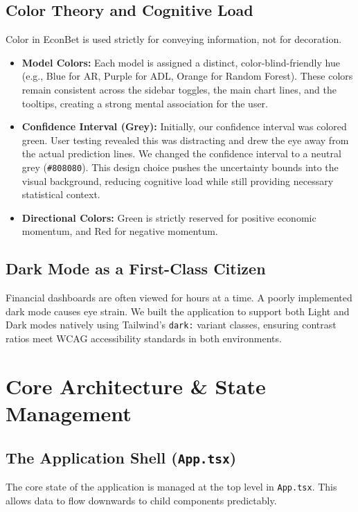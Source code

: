 \documentclass[12pt]{article}
\begin{document}
\subsection{Color Theory and Cognitive Load}
Color in EconBet is used strictly for conveying information, not for decoration. 
\begin{itemize}
    \item \textbf{Model Colors:} Each model is assigned a distinct, color-blind-friendly hue (e.g., Blue for AR, Purple for ADL, Orange for Random Forest). These colors remain consistent across the sidebar toggles, the main chart lines, and the tooltips, creating a strong mental association for the user.
    \item \textbf{Confidence Interval (Grey):} Initially, our confidence interval was colored green. User testing revealed this was distracting and drew the eye away from the actual prediction lines. We changed the confidence interval to a neutral grey (\texttt{\#808080}). This design choice pushes the uncertainty bounds into the visual background, reducing cognitive load while still providing necessary statistical context.
    \item \textbf{Directional Colors:} Green is strictly reserved for positive economic momentum, and Red for negative momentum.
\end{itemize}

\subsection{Dark Mode as a First-Class Citizen}
Financial dashboards are often viewed for hours at a time. A poorly implemented dark mode causes eye strain. We built the application to support both Light and Dark modes natively using Tailwind's \texttt{dark:} variant classes, ensuring contrast ratios meet WCAG accessibility standards in both environments.

\section{Core Architecture \& State Management}

\subsection{The Application Shell (\texttt{App.tsx})}
The core state of the application is managed at the top level in \texttt{App.tsx}. This allows data to flow downwards to child components predictably.
\end{document}
